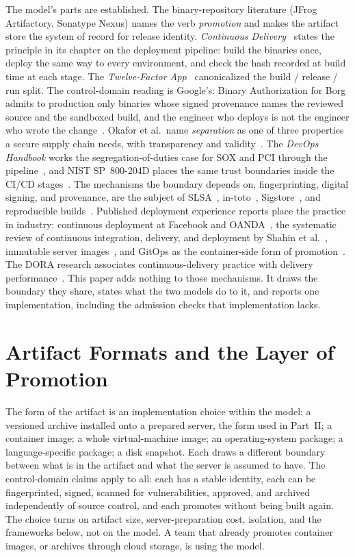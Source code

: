 \documentclass[11pt]{article}
\begin{document}
The model's parts are established. The binary-repository literature (JFrog Artifactory, Sonatype Nexus) names the verb \emph{promotion} and makes the artifact store the system of record for release identity. \emph{Continuous Delivery}~\cite{ContinuousDelivery} states the principle in its chapter on the deployment pipeline: build the binaries once, deploy the same way to every environment, and check the hash recorded at build time at each stage. The \emph{Twelve-Factor App}~\cite{TwelveFactor} canonicalized the build / release / run split. The control-domain reading is Google's: Binary Authorization for Borg admits to production only binaries whose signed provenance names the reviewed source and the sandboxed build, and the engineer who deploys is not the engineer who wrote the change~\cite{BAB,BSRS}. Okafor et al.\ name \emph{separation} as one of three properties a secure supply chain needs, with transparency and validity~\cite{Okafor}. The \emph{DevOps Handbook} works the segregation-of-duties case for SOX and PCI through the pipeline~\cite{DevOpsHandbook}, and NIST SP~800-204D places the same trust boundaries inside the CI/CD stages~\cite{NIST800204D}. The mechanisms the boundary depends on, fingerprinting, digital signing, and provenance, are the subject of SLSA~\cite{SLSA}, in-toto~\cite{InToto}, Sigstore~\cite{Sigstore}, and reproducible builds~\cite{ReproBuilds}. Published deployment experience reports place the practice in industry: continuous deployment at Facebook and OANDA~\cite{Savor}, the systematic review of continuous integration, delivery, and deployment by Shahin et al.~\cite{Shahin}, immutable server images~\cite{Fowler}, and GitOps as the container-side form of promotion~\cite{Beetz}. The DORA research associates continuous-delivery practice with delivery performance~\cite{Accelerate}. This paper adds nothing to those mechanisms. It draws the boundary they share, states what the two models do to it, and reports one implementation, including the admission checks that implementation lacks.

\section{Artifact Formats and the Layer of Promotion}

The form of the artifact is an implementation choice within the model: a versioned archive installed onto a prepared server, the form used in Part~II; a container image; a whole virtual-machine image; an operating-system package; a language-specific package; a disk snapshot. Each draws a different boundary between what is in the artifact and what the server is assumed to have. The control-domain claims apply to all: each has a stable identity, each can be fingerprinted, signed, scanned for vulnerabilities, approved, and archived independently of source control, and each promotes without being built again. The choice turns on artifact size, server-preparation cost, isolation, and the frameworks below, not on the model. A team that already promotes container images, or archives through cloud storage, is using the model.
\end{document}

